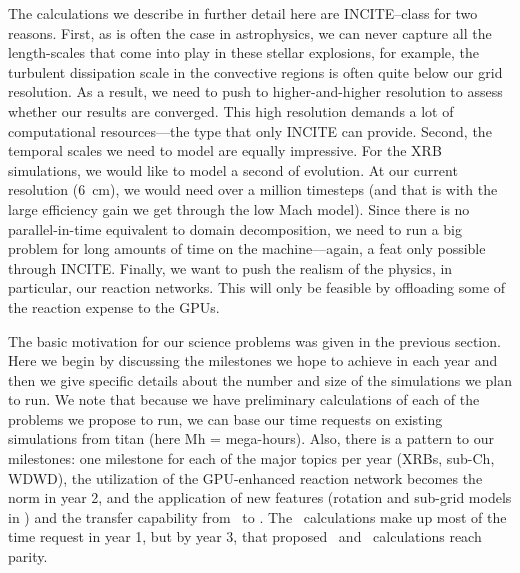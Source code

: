 \documentclass[11pt,letterpaper,english]{article}
\begin{document}
The calculations we describe in further detail here are INCITE--class
for two reasons.  First, as is often the case in astrophysics, we can
never capture all the length-scales that come into play in these
stellar explosions, for example, the turbulent dissipation scale in
the convective regions is often quite below our grid resolution.  As a
result, we need to push to higher-and-higher resolution to assess
whether our results are converged.  This high resolution demands a lot
of computational resources---the type that only INCITE can provide.
Second, the temporal scales we need to model are equally impressive.
For the XRB simulations, we would like to model a second of evolution.
At our current resolution (6~cm), we would need over a million
timesteps (and that is with the large efficiency gain we get through
the low Mach model).  Since there is no parallel-in-time equivalent to
domain decomposition, we need to run a big problem for long amounts of
time on the machine---again, a feat only possible through INCITE.
Finally, we want to push the realism of the physics, in particular,
our reaction networks.  This will only be feasible by offloading some
of the reaction expense to the GPUs.

The basic motivation for our science problems was given in the
previous section.  Here we begin by discussing the milestones we hope
to achieve in each year and then we give specific details about the
number and size of the simulations we plan to run.  We note that because
we have preliminary calculations of each of the problems we propose to
run, we can base our time requests on existing simulations from titan
(here Mh = mega-hours).  Also, there is a pattern to our milestones:
one milestone for each of the major topics per year (XRBs, sub-Ch,
WDWD), the utilization of the GPU-enhanced reaction network becomes the norm in year 2,
and the application of new features (rotation and sub-grid models in
\maestro) and the transfer capability from \maestro\ to \castro.
The \maestro\ calculations make up most of the time request in year 1, but
by year 3, that proposed \castro\ and \maestro\ calculations reach parity.
\end{document}

